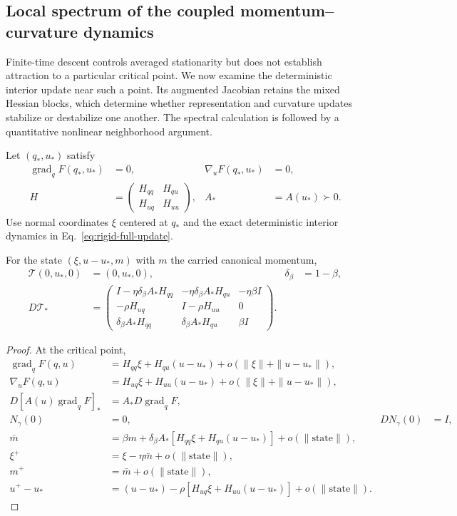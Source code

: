 \subsection{Local spectrum of the coupled momentum--curvature dynamics}
\label{app:rigid-local-spectrum}
Finite-time descent controls averaged stationarity but does not establish attraction to a particular critical point. We now examine the deterministic interior update near such a point. Its augmented Jacobian retains the mixed Hessian blocks, which determine whether representation and curvature updates stabilize or destabilize one another. The spectral calculation is followed by a quantitative nonlinear neighborhood argument.
\begin{assumption}
Let $(q_*,u_*)$ satisfy
\begin{align}
 \operatorname{grad}_qF(q_*,u_*)&=0,&\nabla_uF(q_*,u_*)&=0,\\
 H&=\begin{pmatrix}H_{qq}&H_{qu}\\H_{uq}&H_{uu}\end{pmatrix},&
 A_*&=A(u_*)\succ0.
\end{align}
Use normal coordinates $\xi$ centered at $q_*$ and the exact deterministic interior dynamics in Eq.~\eqref{eq:rigid-full-update}.
\end{assumption}

\begin{proposition}
For the state $(\xi,u-u_*,m)$ with $m$ the carried canonical momentum,
\begin{align}
 \mathcal T(0,u_*,0)&=(0,u_*,0),&
 \delta_\beta&=1-\beta,\\
 D\mathcal T_*&=
 \begin{pmatrix}
 I-\eta\delta_\beta A_*H_{qq}&-\eta\delta_\beta A_*H_{qu}&-\eta\beta I\\
 -\rho H_{uq}&I-\rho H_{uu}&0\\
 \delta_\beta A_*H_{qq}&\delta_\beta A_*H_{qu}&\beta I
 \end{pmatrix}.\label{eq:rigid-local-jacobian}
\end{align}
\end{proposition}
\begin{proof}
At the critical point,
\begin{align}
 \operatorname{grad}_qF(q,u)
 &=H_{qq}\xi+H_{qu}(u-u_*)+o(\|\xi\|+\|u-u_*\|),\\
 \nabla_uF(q,u)
 &=H_{uq}\xi+H_{uu}(u-u_*)+o(\|\xi\|+\|u-u_*\|),\\
 D[A(u)\operatorname{grad}_qF]_*&=A_*D\operatorname{grad}_qF,\\
 N_\gamma(0)&=0,&DN_\gamma(0)&=I,\\
 \bar m&=\beta m+\delta_\beta A_*[H_{qq}\xi+H_{qu}(u-u_*)]+o(\|\mathrm{state}\|),\\
 \xi^+&=\xi-\eta\bar m+o(\|\mathrm{state}\|),\\
 m^+&=\bar m+o(\|\mathrm{state}\|),\\
 u^+-u_*&=(u-u_*)-\rho[H_{uq}\xi+H_{uu}(u-u_*)]+o(\|\mathrm{state}\|).
\end{align}
\end{proof}


